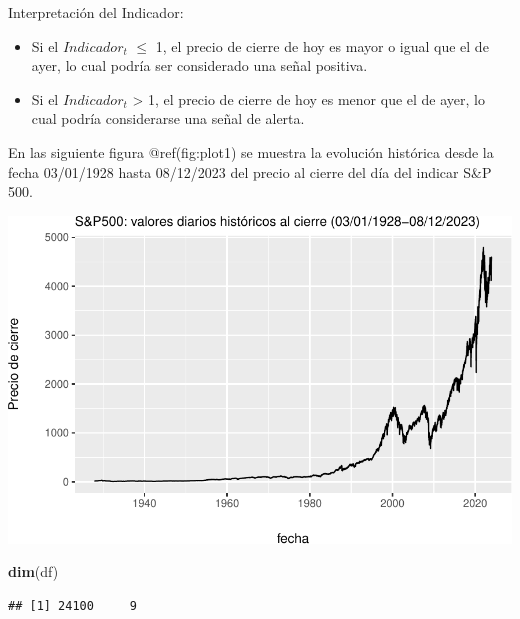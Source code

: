 \documentclass[
  oneside]{article}
\newenvironment{Shaded}{\begin{snugshade}}{\end{snugshade}}
\newcommand{\FunctionTok}[1]{\textcolor[rgb]{0.13,0.29,0.53}{\textbf{#1}}}
\newcommand{\NormalTok}[1]{#1}
\begin{document}
Interpretación del Indicador:

\begin{itemize}
\item Si el $Indicador_t$    $\leq$ 1, el precio de cierre de hoy es mayor o igual que el de ayer, lo cual podría ser considerado una señal positiva.
\item Si el $Indicador_t$ > 1, el precio de cierre de hoy es menor que el de ayer, lo cual podría considerarse una señal de alerta.
\end{itemize}

\vspace{1cm}

En las siguiente figura @ref(fig:plot1) se muestra la evolución
histórica desde la fecha 03/01/1928 hasta 08/12/2023 del precio al
cierre del día del indicar S\&P 500.

\includegraphics{Entrega_Laura_Montaldo_files/figure-latex/plot1-1.pdf}

\begin{Shaded}
\begin{Highlighting}[]
\FunctionTok{dim}\NormalTok{(df)}
\end{Highlighting}
\end{Shaded}

\begin{verbatim}
## [1] 24100     9
\end{verbatim}
\end{document}
